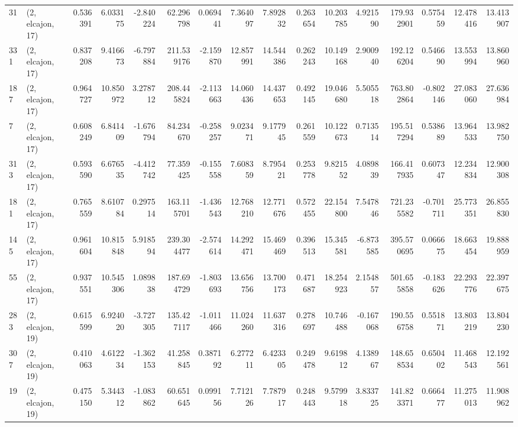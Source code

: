 \begin{tabular}{llrrrrrrrrrrrrrr}
31  &  (2, elcajon, 17) &   0.536391 &   6.033175 &  -2.840224 &    62.296798 &   0.069441 &   7.364097 &   7.892832 &  0.263654 &  10.203785 &   4.921590 &   179.932901 &  0.575459 &  12.478416 &  13.413907 \\
331 &  (2, elcajon, 17) &   0.837208 &   9.416673 &  -6.797884 &   211.539176 &  -2.159870 &  12.857991 &  14.544386 &  0.262243 &  10.149168 &   2.900940 &   192.126204 &  0.546690 &  13.553994 &  13.860960 \\
187 &  (2, elcajon, 17) &   0.964727 &  10.850972 &   3.278712 &   208.445824 &  -2.113663 &  14.060436 &  14.437653 &  0.492145 &  19.046680 &   5.505518 &   763.802864 & -0.802146 &  27.083060 &  27.636984 \\
7   &  (2, elcajon, 17) &   0.608249 &   6.841409 &  -1.676794 &    84.234670 &  -0.258257 &   9.023471 &   9.177945 &  0.261559 &  10.122673 &   0.713514 &   195.517294 &  0.538689 &  13.964533 &  13.982750 \\
313 &  (2, elcajon, 17) &   0.593590 &   6.676535 &  -4.412742 &    77.359425 &  -0.155558 &   7.608359 &   8.795421 &  0.253778 &   9.821552 &   4.089839 &   166.417935 &  0.607347 &  12.234834 &  12.900308 \\
181 &  (2, elcajon, 17) &   0.765559 &   8.610784 &   0.297514 &   163.115701 &  -1.436543 &  12.768210 &  12.771676 &  0.572455 &  22.154800 &   7.547846 &   721.235582 & -0.701711 &  25.773351 &  26.855830 \\
145 &  (2, elcajon, 17) &   0.961604 &  10.815848 &   5.918594 &   239.304477 &  -2.574614 &  14.292471 &  15.469469 &  0.396513 &  15.345581 &  -6.873585 &   395.570695 &  0.066675 &  18.663454 &  19.888959 \\
55  &  (2, elcajon, 17) &   0.937551 &  10.545306 &   1.089838 &   187.694729 &  -1.803693 &  13.656756 &  13.700173 &  0.471687 &  18.254923 &   2.154857 &   501.655858 & -0.183626 &  22.293776 &  22.397675 \\
283 &  (2, elcajon, 19) &   0.615599 &   6.924020 &  -3.727305 &   135.427117 &  -1.011466 &  11.024260 &  11.637316 &  0.278697 &  10.746488 &  -0.167068 &   190.556758 &  0.551871 &  13.803219 &  13.804230 \\
307 &  (2, elcajon, 19) &   0.410063 &   4.612234 &  -1.362153 &    41.258845 &   0.387192 &   6.277211 &   6.423305 &  0.249478 &   9.619812 &   4.138967 &   148.658534 &  0.650402 &  11.468543 &  12.192561 \\
19  &  (2, elcajon, 19) &   0.475150 &   5.344312 &  -1.083862 &    60.651645 &   0.099156 &   7.712126 &   7.787917 &  0.248443 &   9.579918 &   3.833725 &   141.823371 &  0.666477 &  11.275013 &  11.908962 \\

\end{tabular}
